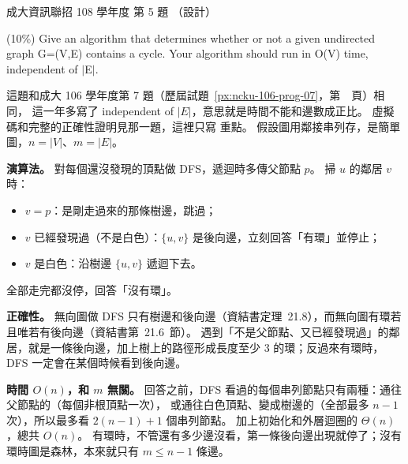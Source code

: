 \begin{pastexam}[label={px:ncku-108-prog-05}]{成大資訊聯招 108 學年度 第 5 題}
（設計）

(10\%) Give an algorithm that determines whether or not a given undirected graph G=(V,E) contains a
cycle. Your algorithm should run in O(V) time, independent of $|$E$|$.
\end{pastexam}

\begin{pastsoln}
這題和成大 106 學年度第 7 題（歷屆試題~\ref{px:ncku-106-prog-07}，第~\pageref{px:ncku-106-prog-07}~頁）相同，
這一年多寫了 independent of $|E|$，意思就是時間不能和邊數成正比。 虛擬碼和完整的正確性證明見那一題，這裡只寫
重點。 假設圖用鄰接串列存，是簡單圖，$n = |V|$、$m = |E|$。

\textbf{演算法。} 對每個還沒發現的頂點做 DFS，遞迴時多傳父節點 $p$。 掃 $u$ 的鄰居 $v$ 時：
\begin{itemize}
\item $v = p$：是剛走過來的那條樹邊，跳過；
\item $v$ 已經發現過（不是白色）：$\{u, v\}$ 是後向邊，立刻回答「有環」並停止；
\item $v$ 是白色：沿樹邊 $\{u, v\}$ 遞迴下去。
\end{itemize}
全部走完都沒停，回答「沒有環」。

\textbf{正確性。} 無向圖做 DFS 只有樹邊和後向邊（資結書定理~21.8），而無向圖有環若且唯若有後向邊（資結書第~21.6~節）。
遇到「不是父節點、又已經發現過」的鄰居，就是一條後向邊，加上樹上的路徑形成長度至少 $3$ 的環；反過來有環時，DFS
一定會在某個時候看到後向邊。

\textbf{時間 $O(n)$，和 $m$ 無關。} 回答之前，DFS 看過的每個串列節點只有兩種：通往父節點的（每個非根頂點一次），
或通往白色頂點、變成樹邊的（全部最多 $n - 1$ 次），所以最多看 $2(n - 1) + 1$ 個串列節點。 加上初始化和外層迴圈的
$\Theta(n)$，總共 $O(n)$。 有環時，不管還有多少邊沒看，第一條後向邊出現就停了；沒有環時圖是森林，本來就只有
$m \le n - 1$ 條邊。
\end{pastsoln}
